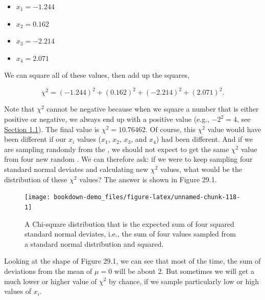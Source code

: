 \documentclass[
  openany]{krantz}
\providecommand{\tightlist}{%
  \setlength{\itemsep}{0pt}\setlength{\parskip}{0pt}}
\begin{document}
\begin{itemize}
\tightlist
\item
  \(x_{1} = -1.244\)
\item
  \(x_{2} = 0.162\)
\item
  \(x_{3} = -2.214\)
\item
  \(x_{4} = 2.071\)
\end{itemize}

We can square all of these values, then add up the squares,

\[\chi^{2} = (-1.244)^{2} + (0.162)^{2} + (-2.214)^{2} + (2.071)^{2}.\]

Note that \(\chi^{2}\) cannot be negative because when we square a number that is either positive or negative, we always end up with a positive value (e.g., \(-2^{2} = 4\), see \protect\hyperlink{numbers-and-operations}{Section 1.1}).
The final value is \(\chi^{2} = 10.76462\).
Of course, this \(\chi^{2}\) value would have been different if our \(x_{i}\) values (\(x_{1}\), \(x_{2}\), \(x_{3}\), and \(x_{4}\)) had been different.
And if we are sampling randomly from the , we should not expect to get the same \(\chi^{2}\) value from four new random .
We can therefore ask: if we were to keep sampling four standard normal deviates and calculating new \(\chi^{2}\) values, what would be the distribution of these \(\chi^{2}\) values?
The answer is shown in Figure 29.1.

\begin{figure}
\texttt{[image: bookdown-demo\_files/figure-latex/unnamed-chunk-118-1]} \caption{A Chi-square distribution that is the expected sum of four squared standard normal deviates, i.e., the sum of four values sampled from a standard normal distribution and squared.}\label{fig:unnamed-chunk-118}
\end{figure}

Looking at the shape of Figure 29.1, we can see that most of the time, the sum of deviations from the mean of \(\mu = 0\) will be about 2.
But sometimes we will get a much lower or higher value of \(\chi^{2}\) by chance, if we sample particularly low or high values of \(x_{i}\).
\end{document}
